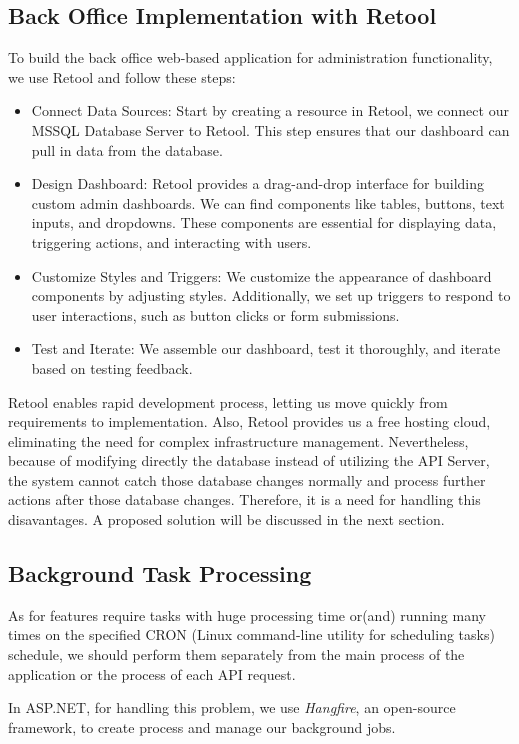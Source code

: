 \subsection{Back Office Implementation with Retool}
To build the back office web-based application for administration functionality, we use Retool and follow these steps:
\begin{itemize}
    \item Connect Data Sources: Start by creating a resource in Retool, we connect our MSSQL Database Server to Retool.
          This step ensures that our dashboard can pull in data from the database.
    \item Design Dashboard: Retool provides a drag-and-drop interface for building custom admin dashboards.
          We can find components like tables, buttons, text inputs, and dropdowns.
          These components are essential for displaying data, triggering actions, and interacting with users.
    \item Customize Styles and Triggers: We customize the appearance of dashboard components by adjusting styles.
          Additionally, we set up triggers to respond to user interactions, such as button clicks or form submissions.
    \item Test and Iterate: We assemble our dashboard, test it thoroughly, and iterate based on testing feedback.
\end{itemize}

Retool enables rapid development process, letting us move quickly from requirements to implementation. Also, Retool provides us a free hosting cloud, eliminating the need for complex infrastructure
management. Nevertheless, because of modifying directly the database instead of utilizing the API Server, the system cannot
catch those database changes normally and process further actions after those database changes. Therefore, it is a need for handling this disavantages.
A proposed solution will be discussed in the next section.

\subsection{Background Task Processing}
As for features require tasks with huge processing time or(and) running many times on the specified CRON (Linux command-line utility for scheduling tasks) schedule,
we should perform them separately from the main process of the application or the process of each API request.

In ASP.NET, for handling this problem, we use \textit{Hangfire}, an open-source framework, to create process and manage our background jobs.

